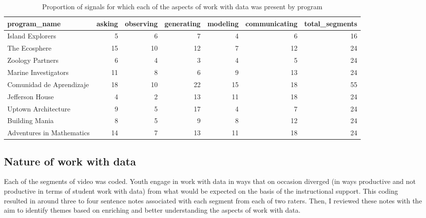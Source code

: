 \documentclass[]{book}
\theoremstyle{definition}
\theoremstyle{definition}
\theoremstyle{definition}
\theoremstyle{remark}
\begin{document}
\begin{landscape}\begin{table}

\caption{\label{tab:unnamed-chunk-9}Proportion of signals for which each of the aspects of work with data was present by program}
\centering
\begin{tabular}[t]{lrrrrrr}
\toprule
program\_name & asking & observing & generating & modeling & communicating & total\_segments\\
\midrule
Island Explorers & 5 & 6 & 7 & 4 & 6 & 16\\
The Ecosphere & 15 & 10 & 12 & 7 & 12 & 24\\
Zoology Partners & 6 & 4 & 3 & 4 & 5 & 24\\
Marine Investigators & 11 & 8 & 6 & 9 & 13 & 24\\
Comunidad de Aprendizaje & 18 & 10 & 22 & 15 & 18 & 55\\
Jefferson House & 4 & 2 & 13 & 11 & 18 & 24\\
Uptown Architecture & 9 & 5 & 17 & 4 & 7 & 24\\
Building Mania & 8 & 5 & 9 & 8 & 12 & 24\\
Adventures in Mathematics & 14 & 7 & 13 & 11 & 18 & 24\\
\bottomrule
\end{tabular}
\end{table}
\end{landscape}

\subsection{Nature of work with data}\label{nature-of-work-with-data}

Each of the segments of video was coded. Youth engage in work with data
in ways that on occasion diverged (in ways productive and not productive
in terms of student work with data) from what would be expected on the
basis of the instructional support. This coding resulted in around three
to four sentence notes associated with each segment from each of two
raters. Then, I reviewed these notes with the aim to identify themes
based on enriching and better understanding the aspects of work with
data.
\end{document}
